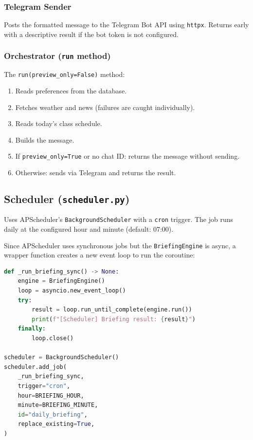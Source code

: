 \documentclass[12pt, a4paper]{article}
\begin{document}
\subsubsection{Telegram Sender}

Posts the formatted message to the Telegram Bot API using \texttt{httpx}. Returns early with a descriptive result if the bot token is not configured.

\subsubsection{Orchestrator (\texttt{run} method)}

The \texttt{run(preview\_only=False)} method:
\begin{enumerate}[leftmargin=2em]
  \item Reads preferences from the database.
  \item Fetches weather and news (failures are caught individually).
  \item Reads today's class schedule.
  \item Builds the message.
  \item If \texttt{preview\_only=True} or no chat ID: returns the message without sending.
  \item Otherwise: sends via Telegram and returns the result.
\end{enumerate}

\subsection{Scheduler (\texttt{scheduler.py})}

Uses APScheduler's \texttt{BackgroundScheduler} with a \texttt{cron} trigger. The job runs daily at the configured hour and minute (default: 07:00).

Since APScheduler uses synchronous jobs but the \texttt{BriefingEngine} is async, a wrapper function creates a new event loop to run the coroutine:

\begin{lstlisting}[language=Python, title={scheduler.py}]
def _run_briefing_sync() -> None:
    engine = BriefingEngine()
    loop = asyncio.new_event_loop()
    try:
        result = loop.run_until_complete(engine.run())
        print(f"[Scheduler] Briefing result: {result}")
    finally:
        loop.close()

scheduler = BackgroundScheduler()
scheduler.add_job(
    _run_briefing_sync,
    trigger="cron",
    hour=BRIEFING_HOUR,
    minute=BRIEFING_MINUTE,
    id="daily_briefing",
    replace_existing=True,
)
\end{lstlisting}
\end{document}
